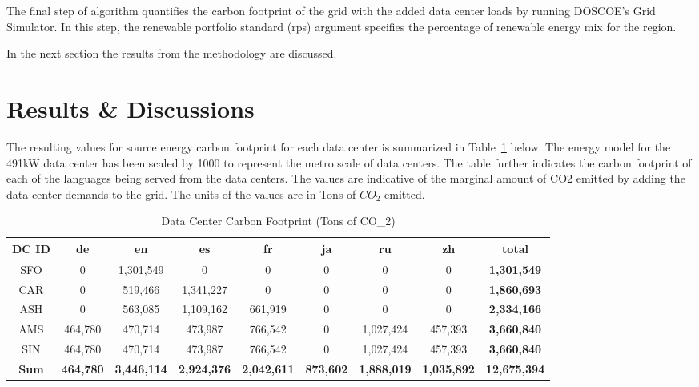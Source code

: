   The final step of algorithm quantifies the carbon footprint of the grid with the added data center loads by running DOSCOE’s Grid Simulator. In this step, the renewable portfolio standard (rps) argument specifies the percentage of renewable energy mix for the region.  

  In the next section the results from the methodology are discussed. 


\section{Results \& Discussions}
The resulting values for source energy carbon footprint for each data center is summarized in Table~\ref{table:tab03} below. The energy model for the 491kW data center has been scaled by 1000 to represent the metro scale of data centers. The table further indicates the carbon footprint of each of the languages being served from the data centers. The values are indicative of the marginal amount of CO2 emitted by adding the data center demands to the grid. The units of the values are in Tons of $CO_2$ emitted.


\begin{table}[ht]
  \vspace{-10 pt}
  \caption{Data Center Carbon Footprint (Tons of CO_2)}
  \label{table:tab03}
  \begin{small}
  \centering
  \begin{tabular}{|c c c c c c c c c| }
    \hline
    \bf{DC ID} & \bf{de} & \bf{en}    & \bf{es} & \bf{fr} & \bf{ja} & \bf{ru} & \bf{zh} & \bf{total}\\
    \hline
    SFO       & 0       & 1,301,549  & 0           & 0      & 0 & 0 & 0 & \bf{1,301,549}\\
    CAR       & 0       & 519,466    & 1,341,227  & 0       & 0 & 0 & 0 & \bf{1,860,693}\\
    ASH       & 0       & 563,085    & 1,109,162  & 661,919 & 0 & 0 & 0 & \bf{2,334,166}\\
    AMS       & 464,780 & 470,714    & 473,987    & 766,542 & 0 & 1,027,424 & 457,393 & \bf{3,660,840}\\
    SIN       & 464,780 & 470,714    & 473,987    & 766,542 & 0 & 1,027,424 & 457,393 & \bf{3,660,840}\\
    \hline
    \bf{Sum} & \bf{464,780} & \bf{3,446,114}    & \bf{2,924,376} & \bf{2,042,611} & \bf{873,602} & \bf{1,888,019} & \bf{1,035,892} & \bf{12,675,394}\\
    \hline
  \end{tabular}
  \end{small}
  \vspace{-10 pt}   %
  \end{table}

